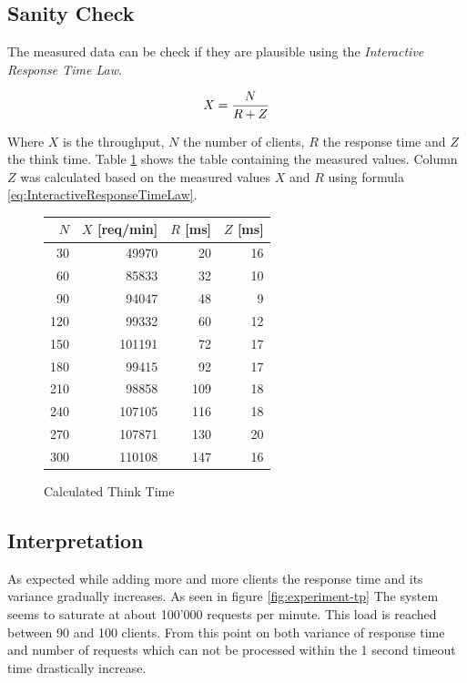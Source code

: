 \documentclass[a4paper]{article}
\begin{document}

\subsection{Sanity Check}

The measured data can be check if they are plausible using the \textit{Interactive Response Time Law}.

\begin{equation}
\label{eq:InteractiveResponseTimeLaw}
X = {{N} \over {R + Z}}
\end{equation}


Where $X$ is the throughput, $N$ the number of clients, $R$ the response time and $Z$ the think 	time. Table \ref{tabular:experimentsanitycheck} shows the table containing the measured values. Column $Z$ was calculated based on the measured values $X$ and $R$ using formula \ref{eq:InteractiveResponseTimeLaw}. 

\begin{figure}[H]
\label{tabular:experimentsanitycheck}
\begin{center}
\begin{tabular}{|r|r|r|r|}
\hline 
$N$ & $X$ [req/min] & $R$ [ms] & $Z$ [ms]\\
\hline 
30&	49970&	20&	16\\
60&	85833&	32&	10\\
90&	94047&	48&	9\\
120&	99332&	60&	12\\
150&	101191&	72&	17\\
180&	99415&	92&	17\\
210&	98858&	109&	18\\
240&	107105&	116&	18\\
270&	107871&	130&	20\\
300&	110108&	147&	16\\
\hline 
\end{tabular} 
\caption{Calculated Think Time}
\end{center}
\end{figure}


\subsection{Interpretation}

As expected while adding more and more clients the response time and its variance gradually increases. As seen in figure \ref{fig:experiment-tp} The system seems to saturate at about 100'000 requests per minute. This load is reached between 90 and 100 clients. From this point on both variance of response time and number of requests which can not be processed within the 1 second timeout time drastically increase.
\end{document}
